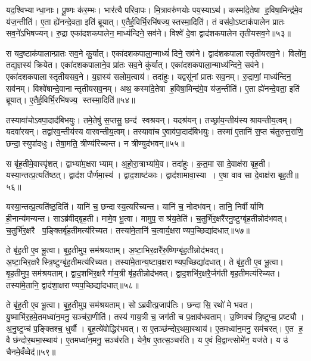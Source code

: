 यद॒श्विभ्यान्धा॒नाः। पू॒ष्णः क॑र॒म्भः। भार॑त्यै परिवा॒पः। मि॒त्रावरु॑णयोः पय॒स्याऽथ॑। कस्मा॑दे॒तेषा ह॒विषा॒मिन्द्र॑मे॒व य॑ज॒न्तीति॑। ए॒ता ह्ये॑नन्दे॒वता॒ इति॑ ब्रूयात्। ए॒तैर्\mbox{}ह॒विर्भि॒\-रभि॑षज्य॒स्तस्मा॒दिति॑। तं वस॑वो॒ऽष्टाक॑पालेन प्रातः सव॒ने॑ऽभिषज्यन्। रु॒द्रा एका॑दशकपालेन॒ माध्य॑न्दिने॒ सव॑ने। विश्वे॑ दे॒वा द्वाद॑शकपालेन तृतीयसव॒ने॥५३॥

स यद॒ष्टाक॑पालान्प्रातः सव॒ने कु॒र्यात्। एका॑दशकपाला॒न्माध्यं॑ दिने॒ सव॑ने। द्वाद॑शकपालास्तृतीयसव॒ने। विलो॑म॒ तद्य॒ज्ञस्य॑ क्रियेत। एका॑दशकपालाने॒व प्रा॑तः सव॒ने कु॑र्यात्। एका॑दशकपाला॒न्माध्य॑न्दिने॒ सव॑ने। एका॑दशकपालास्तृतीयसव॒ने। य॒ज्ञस्य॑ सलोम॒त्वाय॑। तदा॑हुः। यद्वसू॑नां प्रातः सव॒नम्। रु॒द्राणां॒ माध्य॑न्दिन॒ सव॑नम्। विश्वे॑षान्दे॒वानान्तृतीयसव॒नम्। अथ॒ कस्मा॑दे॒तेषा ह॒विषा॒मिन्द्र॑मे॒व य॑ज॒न्तीति॑। ए॒ता ह्ये॑नन्दे॒वता॒ इति॑ ब्रूयात्। ए॒तैर्\mbox{}ह॒विर्भि॒रभि॑षज्य॒ स्तस्मा॒दिति॑॥५४॥\anuvakamend[ए॒क॒वि॒श आ॑हुस्तृतीयसव॒ने प्रा॑तः सव॒नं पञ्च॑ च]

तस्यावा॑चोऽवपा॒दाद॑बिभयुः। तमे॒तेषु॑ स॒प्तसु॒ छन्द॑ स्वश्रयन्। यदश्र॑यन्। तच्छ्रा॑य॒न्तीय॑स्य श्रायन्तीय॒त्वम्। यदवा॑रयन्। तद्वा॑रव॒न्तीय॑स्य वारवन्तीय॒त्वम्। तस्यावा॑च ए॒वाव॑पा॒दाद॑बिभयुः। तस्मा॑ ए॒तानि॑ स॒प्त च॑तुरुत्त॒राणि॒ छन्दा॒स्युपा॑दधुः। तेषा॒मति॒ त्रीण्य॑रिच्यन्त। न त्रीण्युद॑भवन्॥५५॥

स बृ॑ह॒तीमे॒वास्पृ॑शत्। द्वाभ्या॑म॒क्षराभ्याम्। अ॒हो॒रा॒त्राभ्या॑मे॒व। तदा॑हुः। क॒त॒मा सा दे॒वाक्ष॑रा बृह॒ती। यस्या॒न्तत्प्र॒त्यति॑ष्ठत्। द्वाद॑श पौर्णमा॒स्य॑। द्वाद॒शाष्ट॑काः। द्वाद॑शामावा॒स्या। ए॒षा वाव सा दे॒वाक्ष॑रा बृह॒ती॥५६॥

यस्या॒न्तत्प्र॒त्यति॑ष्ठ॒दिति॑। यानि॑ च॒ छन्दास्य॒त्यरि॑च्यन्त। यानि॑ च॒ नोदभ॑वन्। तानि॒ निर्वीर्याणि ही॒नान्य॑मन्यन्त। साऽब्र॑वीद्बृह॒ती। मामे॒व भू॒त्वा। मामुप॒ सश्र॑य॒तेति॑। च॒तुर्भि॑र॒क्षरै॑रनु॒ष्टुग्बृ॑ह॒तीन्नोद॑भवत्। च॒तुर्भि॑र॒क्षरै प॒ङ्क्तिर्बृ॑ह॒ती\-मत्य॑रिच्यत। तस्या॑मे॒तानि॑ च॒त्वार्य॒क्षराण्यप॒च्छिद्या॑\-दधात्॥५७॥

ते बृ॑ह॒ती ए॒व भू॒त्वा। बृ॒ह॒तीमुप॒ सम॑श्रयताम्। अ॒ष्टा॒भि\-र॒क्षरै॑रु॒ष्णिग्बृ॑ह॒तीन्नोद॑भवत्। अ॒ष्टा॒भि\-र॒क्षरैस्त्रि॒ष्टुग्बृ॑ह॒ती\-मत्य॑\-रिच्यत। तस्या॑मे॒तान्य॒ष्टाव॒क्षराण्यप॒च्छिद्या॑\-दधात्। ते बृ॑ह॒ती ए॒व भू॒त्वा। बृ॒ह॒तीमुप॒ सम॑श्रयताम्। द्वा॒द॒शभि॑र॒क्षरैर्गाय॒त्री बृ॑ह॒तीन्नोद॑भवत्। द्वा॒द॒शभि॑र॒क्षरै॒र्जग॑ती बृह॒तीमत्य॑रिच्यत। तस्या॑मे॒तानि॒ द्वाद॑शा॒क्षराण्यप॒च्छिद्या॑\-दधात्॥५८॥

ते बृ॑ह॒ती ए॒व भू॒त्वा। बृ॒ह॒तीमुप॒ सम॑श्रयताम्। सोऽब्रवीत्प्र॒जाप॑तिः। छन्दासि॒ रथो॑ मे भवत। यु॒ष्माभि॑र॒हमे॒तमध्वा॑न॒मनु॒ सञ्च॑रा॒णीति॑। तस्य॑ गाय॒त्री च॒ जग॑ती च प॒क्षाव॑भवताम्। उ॒ष्णिक्च॑ त्रि॒ष्टुप्च॒ प्रष्ट्यौ। अ॒नु॒ष्टुप्च॑ प॒ङ्क्तिश्च॒ धुर्यौ। बृ॒ह॒त्ये॑वोद्धिर॑भवत्। स ए॒तञ्छ॑न्दोर॒थमा॒स्थाय॑। ए॒तमध्वा॑न॒मनु॒ सम॑चरत्। ए॒त ह॒ वै छ॑न्दोर॒थमा॒स्थाय॑। ए॒तमध्वा॑न॒मनु॒ सञ्च॑रति। येनै॒ष ए॒तत्स॒ञ्चर॑ति। य ए॒वं वि॒द्वान्त्सोमे॑न॒ यज॑ते। य उ॑ चैनमे॒वँव्वेद॑॥५९॥\anuvakamend[अ॒भ॒व॒न्वाव सा दे॒वाक्ष॑रा बृह॒त्य॑दधा॒द्द्वाद॑शा॒क्षराण्यप॒च्छिद्या॑दधादा॒स्थाय॒ षट्च॑]

